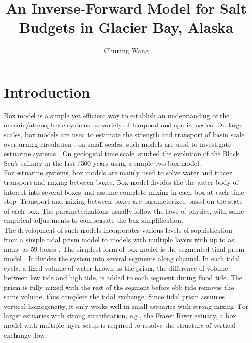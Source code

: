 \documentclass{article}
\title{An Inverse-Forward Model for Salt Budgets in Glacier Bay, Alaska}
\author{Chuning Wang}
\begin{document}
\maketitle

\section{Introduction}
Box model is a simple yet efficient way to establish an understanding of the oceanic/atmospheric systems \citep{guan2008stommel, stommel1961thermohaline} on variety of temporal and spatial scales. On large scales, box models are used to estimate the strength and transport of basin scale overturning circulation \citep{stommel1961thermohaline}; on small scales, such models are used to investigate estuarine systems \citep{sun2017box, rogers2017improved, krvavica2016field, ljubenkov2015hydrodynamic, longphuirt2016influence, staehr2017decadal, tomaso2015long, wang1999water}. On geological time scale, \citet{karaca1999box} studied the evolution of the Black Sea's salinity in the last 7500 years using a simple two-box model.\\

For estuarine systems, box models are mainly used to solve water and tracer transport and mixing between boxes. Box model divides the the water body of interest into several boxes and assume complete mixing in each box at each time step. Transport and mixing between boxes are parameterized based on the state of each box. The parameterizations usually follow the laws of physics, with some empirical adjustments to compensate the box simplification.\\

The development of such models incorporates various levels of sophistication - from a simple tidal prism model \citep{valle2010contemporary} to models with multiple layers with up to as many as 59 boxes \citep{walker1999coupled}. The simplest form of box model is the segmented tidal prism model \citep{dyer1973simple}. It divides the system into several segments along channel. In each tidal cycle, a fixed volume of water known as the prism, the difference of volume between low tide and high tide, is added to each segment during flood tide. The prism is fully mixed with the rest of the segment before ebb tide removes the same volume, thus complete the tidal exchange. Since tidal prism assumes vertical homogeneity, it only works well in small estuaries with strong mixing. For larger estuaries with strong stratification, e.g., the Fraser River estuary, a box model with multiple layer setup is required to resolve the structure of vertical exchange flow.\\
\end{document}
